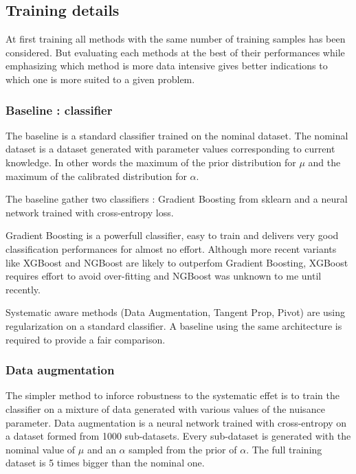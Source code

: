 \subsection{Training details} %
\label{sub:training_details}


At first training all methods with the same number of training samples has been considered.
But evaluating each methods at the best of their performances while emphasizing which method is more data intensive gives better indications to which one is more suited to a given problem.


\subsubsection{Baseline : classifier} %
\label{ssub:baseline_classifier}

The baseline is a standard classifier trained on the nominal dataset.
The nominal dataset is a dataset generated with parameter values corresponding to current knowledge.
In other words the maximum of the prior distribution for $\mu$ and the maximum of the calibrated distribution for $\alpha$.

The baseline gather two classifiers : Gradient Boosting from sklearn \needcite and a neural network trained with cross-entropy loss.

Gradient Boosting is a powerfull classifier, easy to train and delivers very good classification performances for almost no effort.
Although more recent variants like XGBoost \needcite and NGBoost \needcite are likely to outperfom Gradient Boosting, XGBoost requires effort to avoid over-fitting and NGBoost was unknown to me until recently.

Systematic aware methods (Data Augmentation, Tangent Prop, Pivot) are using regularization on a standard classifier.
A baseline using the same architecture is required to provide a fair comparison.




\subsubsection{Data augmentation} %
\label{ssub:data_augmentation}


The simpler method to inforce robustness to the systematic effet is to train the classifier on a mixture of data generated with various values of the nuisance parameter.
Data augmentation is a neural network trained with cross-entropy on a dataset formed from 1000 sub-datasets.
Every sub-dataset is generated with the nominal value of $\mu$ and an $\alpha$ sampled from the prior of $\alpha$.
The full training dataset is 5 times bigger than the nominal one.



